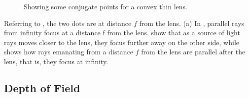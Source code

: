 \begin{figure}
\centerline{
}
\caption{Showing some conjugate points for a convex thin lens.  }
\label{fig:lenspropt}
\end{figure}
Referring to \fig{\ref{fig:lenspropt}}, the two dots are at distance $f$ from the lens. (a) In , parallel  rays from infinity focus at a distance f from the lens.   show that as a source of light rays moves closer to the lens, they focus further away on the other side, while  shows how rays emanating from a distance $f$ from the lens are parallel after the lens, that is, they focus at infinity.


\subsection{Depth of Field}

